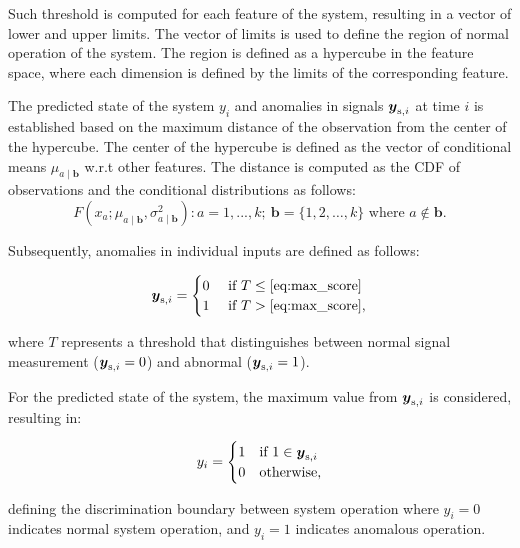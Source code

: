 Such threshold is computed for each feature of the system, resulting in a vector of lower and upper limits. The vector of limits is used to define the region of normal operation of the system. The region is defined as a hypercube in the feature space, where each dimension is defined by the limits of the corresponding feature.

The predicted state of the system $y_i$ and anomalies in signals $\boldsymbol{y} _{\text{s}, i}$ at time $i$ is established based on the maximum distance of the observation from the center of the hypercube. The center of the hypercube is defined as the vector of conditional means $\mu_{a \mid \boldsymbol{b}}$ w.r.t other features. The distance is computed as the CDF of observations and the conditional distributions as follows:
\begin{equation}
 {F(x_a; \mu_{a \mid \boldsymbol{b}}, \sigma_{a \mid \boldsymbol{b}}^2)}:a = 1,...,k;~ \boldsymbol{b} = \{1, 2, \ldots, k\} \text{ where }a \notin \boldsymbol{b} \text{.}\label{eq:max_score}
\end{equation}

Subsequently, anomalies in individual inputs are defined as follows:

\begin{equation}
 \boldsymbol{y} _{\text{s}, i} =
 \begin{cases}
 0 & \text{ if } T \leq \eqref{eq:max_score}
 \\
 1 & \text{ if } T > \eqref{eq:max_score}
 \text{,}\label{eq:anomaly_signal}
 \end{cases}
\end{equation}

where $T$ represents a threshold that distinguishes between normal signal measurement ($\boldsymbol{y} _{\text{s}, i} = 0$) and abnormal ($\boldsymbol{y} _{\text{s}, i} = 1$).

For the predicted state of the system, the maximum value from $\boldsymbol{y} _{\text{s}, i}$ is considered, resulting in:

\begin{equation}
 y_i =
 \begin{cases}
 1 & \text{if } 1 \in \boldsymbol{y} _{\text{s}, i}
 \\
 0 & \text{otherwise}
 \text{,}\label{eq:anomaly}
 \end{cases}
\end{equation}


defining the discrimination boundary between system operation where $y_i = 0$ indicates normal system operation, and $y_i = 1$ indicates anomalous operation.


